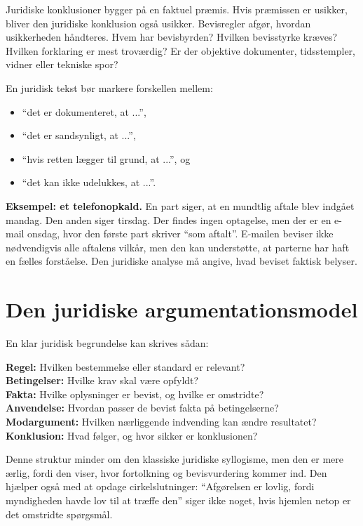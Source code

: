Juridiske konklusioner bygger på en faktuel præmis. Hvis præmissen er usikker, bliver den juridiske konklusion også usikker. Bevisregler afgør, hvordan usikkerheden håndteres. Hvem har bevisbyrden? Hvilken bevisstyrke kræves? Hvilken forklaring er mest troværdig? Er der objektive dokumenter, tidsstempler, vidner eller tekniske spor?

En juridisk tekst bør markere forskellen mellem:
\begin{itemize}
  \item ``det er dokumenteret, at ...'',
  \item ``det er sandsynligt, at ...'',
  \item ``hvis retten lægger til grund, at ...'', og
  \item ``det kan ikke udelukkes, at ...''.
\end{itemize}

\begin{examplebox}
\textbf{Eksempel: et telefonopkald.} En part siger, at en mundtlig aftale blev indgået mandag. Den anden siger tirsdag. Der findes ingen optagelse, men der er en e-mail onsdag, hvor den første part skriver ``som aftalt''. E-mailen beviser ikke nødvendigvis alle aftalens vilkår, men den kan understøtte, at parterne har haft en fælles forståelse. Den juridiske analyse må angive, hvad beviset faktisk belyser.
\end{examplebox}

\section{Den juridiske argumentationsmodel}

En klar juridisk begrundelse kan skrives sådan:

\begin{methodbox}
\textbf{Regel:} Hvilken bestemmelse eller standard er relevant?\\
\textbf{Betingelser:} Hvilke krav skal være opfyldt?\\
\textbf{Fakta:} Hvilke oplysninger er bevist, og hvilke er omstridte?\\
\textbf{Anvendelse:} Hvordan passer de bevist fakta på betingelserne?\\
\textbf{Modargument:} Hvilken nærliggende indvending kan ændre resultatet?\\
\textbf{Konklusion:} Hvad følger, og hvor sikker er konklusionen?
\end{methodbox}

Denne struktur minder om den klassiske juridiske syllogisme, men den er mere ærlig, fordi den viser, hvor fortolkning og bevisvurdering kommer ind. Den hjælper også med at opdage cirkelslutninger: ``Afgørelsen er lovlig, fordi myndigheden havde lov til at træffe den'' siger ikke noget, hvis hjemlen netop er det omstridte spørgsmål.

